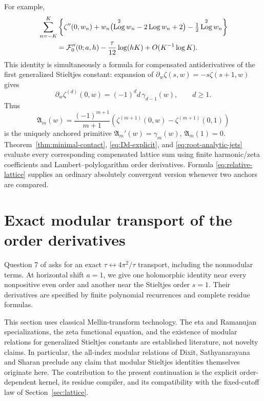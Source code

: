 \documentclass[11pt,letterpaper]{article}
\numberwithin{equation}{section}
\theoremstyle{definition}
\theoremstyle{remark}
\DeclareMathOperator{\Log}{Log}
\begin{document}
For example,
\begin{equation}\label{eq:D2-cutoff}
 \begin{split}
 &\sum_{n=-K}^{K}
 \left\{\zeta''(0,w_n)+w_n\bigl(\Log^2w_n-2\Log w_n+2\bigr)
                       -\tfrac12\Log^2w_n\right\}\\
 &\hspace{9mm}
 ={\cal F}_0''(0;a,h)-\frac{\tau}{12}\log(hK)
            +O(K^{-1}\log K).
 \end{split}
\end{equation}
This identity is simultaneously a formula for compensated
antiderivatives of the first generalized Stieltjes constant:
expansion of
\(\partial_w\zeta(s,w)=-s\zeta(s+1,w)\) gives
\begin{equation}\label{eq:stieltjes-primitive-root}
 \partial_w\zeta^{(d)}(0,w)=(-1)^d d\,\gamma_{d-1}(w),
 \qquad d\geq1.
\end{equation}
Thus
\[
 {\mathfrak A}_m(w)=\frac{(-1)^{m+1}}{m+1}
       \left(\zeta^{(m+1)}(0,w)-\zeta^{(m+1)}(0,1)\right)
\]
is the uniquely anchored primitive
\(\mathfrak A_m'(w)=\gamma_m(w)\),
\(\mathfrak A_m(1)=0\). Theorem~\ref{thm:minimal-contact},
\eqref{eq:Dd-explicit}, and \eqref{eq:root-analytic-jets}
evaluate every corresponding compensated lattice sum using finite
harmonic/zeta coefficients and Lambert--polylogarithm order
derivatives. Formula \eqref{eq:relative-lattice} supplies an
ordinary absolutely convergent version whenever two anchors are
compared.




\section{Exact modular transport of the order derivatives}
\label{sec:modular}

Question 7 of \cite{RepoVertical} asks for an exact
\(\tau\leftrightarrow4\pi^2/\tau\) transport, including the
nonmodular terms. At horizontal shift \(a=1\), we give one
holomorphic identity near every nonpositive even order and another
near the Stieltjes order \(s=1\). Their derivatives are specified
by finite polynomial recurrences and complete residue formulas.

This section uses classical Mellin-transform technology. The eta
and Ramanujan specializations, the zeta functional equation, and
the existence of modular relations for generalized Stieltjes
constants are established literature, not novelty claims.
In particular, the all-index modular relations of Dixit,
Sathyanarayana and Sharan \cite{DixitStieltjes} preclude any claim
that modular Stieltjes identities themselves originate here.
The contribution to the present continuation is the explicit
order-dependent kernel, its residue compiler, and its compatibility
with the fixed-cutoff law of Section~\ref{sec:lattice}.
\end{document}

